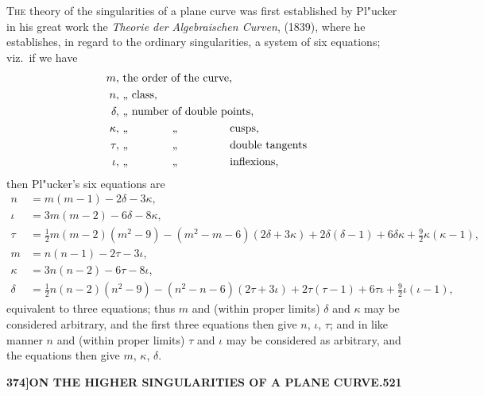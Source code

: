 \documentclass[11pt,a4paper]{article}
\begin{document}
\noindent
\textsc{The} theory of the singularities of a plane curve was first established by Pl"{u}cker in his great work the \textit{Theorie der Algebraischen Curven}, (1839), where he establishes, in regard to the ordinary singularities, a system of six equations; viz.~if we have
\begin{align*}
m, &\ \text{the order of the curve,}\\
n, &\ \text{,, class,}\\
\delta, &\ \text{,, number of double points,}\\
\kappa, &\ \text{,, \phantom{number} ,, \phantom{of double} cusps,}\\
\tau, &\ \text{,, \phantom{number} ,, \phantom{of double} double tangents}\\
\iota, &\ \text{,, \phantom{number} ,, \phantom{of double} inflexions,}
\end{align*}
then Pl"{u}cker's six equations are
\begin{align*}
n &= m(m - 1) - 2\delta - 3\kappa,\\
\iota &= 3m(m - 2) - 6\delta - 8\kappa,\\
\tau &= \tfrac{1}{2}m(m - 2)(m^{2} - 9) - (m^{2} - m - 6)(2\delta + 3\kappa) + 2\delta(\delta - 1) + 6\delta\kappa + \tfrac{9}{2}\kappa(\kappa - 1),\\
m &= n(n - 1) - 2\tau - 3\iota,\\
\kappa &= 3n(n - 2) - 6\tau - 8\iota,\\
\delta &= \tfrac{1}{2}n(n - 2)(n^{2} - 9) - (n^{2} - n - 6)(2\tau + 3\iota) + 2\tau(\tau - 1) + 6\tau\iota + \tfrac{9}{2}\iota(\iota - 1),
\end{align*}
equivalent to three equations; thus $m$ and (within proper limits) $\delta$ and $\kappa$ may be considered arbitrary, and the first three equations then give $n$, $\iota$, $\tau$; and in like manner $n$ and (within proper limits) $\tau$ and $\iota$ may be considered as arbitrary, and the equations then give $m$, $\kappa$, $\delta$.

\newpage
\begin{flushright}
\textbf{374]\hspace{1em}ON THE HIGHER SINGULARITIES OF A PLANE CURVE.\hfill521}
\end{flushright}

\vspace{12pt}
\end{document}
